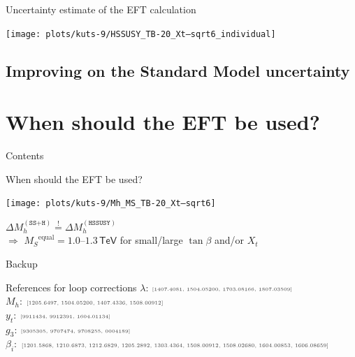 \documentclass[hyperref={pdfpagelabels=false},ngerman]{beamer}
\newcommand{\eh}[1]{\,\mathsf{#1}}
\newcommand{\TeV}{\eh{TeV}}
\newcommand{\MS}{\ensuremath{M_S}}
\newcommand{\mycite}[1]{\ensuremath{\text{\textcolor{darkgray}{\tiny [#1]}}}}
\newcommand{\DMh}{\ensuremath{\Delta M_h^{(\texttt{SS+H})}}}
\newcommand{\DMhHSSUSY}{\ensuremath{\Delta M_h^{(\HSSUSY)}}}
\def\HSSUSY{\texttt{HSSUSY}}
\begin{document}
\begin{frame}{Uncertainty estimate of the EFT calculation}
  \begin{center}
    \texttt{[image: plots/kuts-9/HSSUSY\_TB-20\_Xt--sqrt6\_individual]}
  \end{center}
\end{frame}

\subsection{Improving on the Standard Model uncertainty}

\section{When should the EFT be used?}

\begin{frame}{Contents}
  \tableofcontents[currentsection]
\end{frame}

\begin{frame}{When should the EFT be used?}
  \begin{center}
    \texttt{[image: plots/kuts-9/Mh\_MS\_TB-20\_Xt--sqrt6]}
  \end{center}
  \begin{center}
    $\DMh \overset{!}{=} \DMhHSSUSY$\\[0.5em]
    $\Rightarrow$ $\MS^{\text{equal}} = 1.0$--$1.3\TeV$ for
    small/large $\tan\beta$ and/or $X_t$
  \end{center}
\end{frame}

\begin{frame}[noframenumbering]
  \begin{center}
    \Huge Backup
  \end{center}
\end{frame}

\begin{frame}[noframenumbering]{References for loop corrections}
  $\lambda$: \mycite{1407.4081, 1504.05200, 1703.08166, 1807.03509}\\
  $M_h$: \mycite{1205.6497, 1504.05200, 1407.4336, 1508.00912}\\
  $y_t$: \mycite{9911434, 9912391, 1604.01134}\\
  $g_3$: \mycite{9305305, 9707474, 9708255, 0004189}\\
  $\beta_i$: \mycite{1201.5868, 1210.6873, 1212.6829, 1205.2892, 1303.4364, 1508.00912, 1508.02680, 1604.00853, 1606.08659}
\end{frame}
\end{document}
